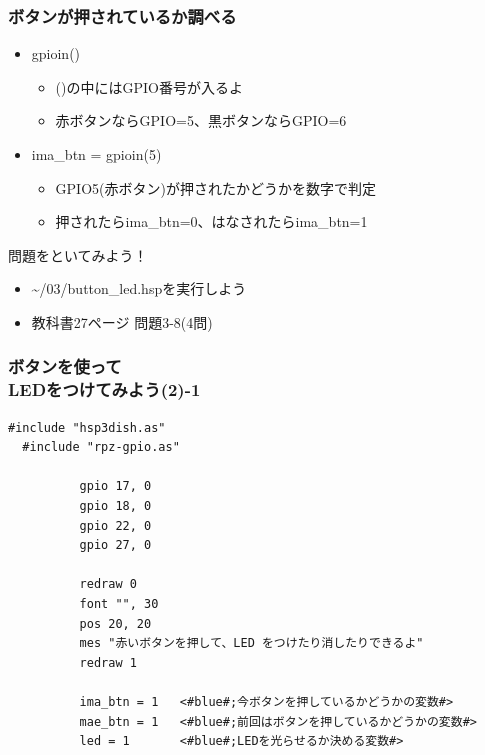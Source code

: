 \documentclass[slide03.tex]{subfiles}
\begin{document}
\begin{frame}
  \frametitle{ボタンが押されているか調べる}
  \begin{itemize}
    \item gpioin()
          \begin{itemize}
            \item ()の中にはGPIO番号が入るよ
            \item 赤ボタンならGPIO=5、黒ボタンならGPIO=6
          \end{itemize}
    \item ima\_btn = gpioin(5)
          \begin{itemize}
            \item GPIO5(赤ボタン)が押されたかどうかを数字で判定
            \item 押されたらima\_btn=0、はなされたらima\_btn=1
          \end{itemize}
  \end{itemize}
\end{frame}

\begin{frame}
  \begin{exampleblock}{問題をといてみよう！}
    \begin{itemize}
      \item \sim/03/button\_led.hspを実行しよう
      \item 教科書27ページ 問題3-8(4問)
    \end{itemize}
  \end{exampleblock} 
\end{frame}

\begin{frame}[fragile]
  \frametitle{ボタンを使って\\LEDをつけてみよう(2)-1}
  \begin{lstlisting}[title=\sim/03/button\_led2.hsp 前半, label=button_led2.hsp-1]
  #include "hsp3dish.as"
  #include "rpz-gpio.as"
  
          gpio 17, 0
          gpio 18, 0
          gpio 22, 0
          gpio 27, 0
        
          redraw 0
          font "", 30
          pos 20, 20
          mes "赤いボタンを押して、LED をつけたり消したりできるよ"
          redraw 1

          ima_btn = 1   <#blue#;今ボタンを押しているかどうかの変数#>
          mae_btn = 1   <#blue#;前回はボタンを押しているかどうかの変数#>
          led = 1       <#blue#;LEDを光らせるか決める変数#>
  \end{lstlisting}
\end{frame}
\end{document}
